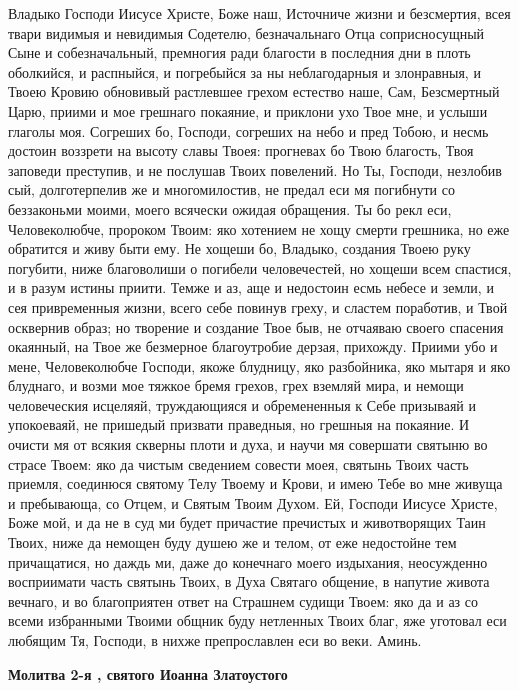 Владыко Господи Иисусе Христе, Боже наш, Источниче жизни и безсмертия, всея твари видимыя и невидимыя Содетелю, безначальнаго Отца соприсносущный Сыне и собезначальный, премногия ради благости в последния дни в плоть оболкийся, и распныйся, и погребыйся за ны неблагодарныя и злонравныя, и Твоею Кровию обновивый растлевшее грехом естество наше, Сам, Безсмертный Царю, приими и мое грешнаго покаяние, и приклони ухо Твое мне, и услыши глаголы моя. Согреших бо, Господи, согреших на небо и пред Тобою, и несмь достоин воззрети на высоту славы Твоея: прогневах бо Твою благость, Твоя заповеди преступив, и не послушав Твоих повелений. Но Ты, Господи, незлобив сый, долготерпелив же и многомилостив, не предал еси мя погибнути со беззаконьми моими, моего всячески ожидая обращения. Ты бо рекл еси, Человеколюбче, пророком Твоим: яко хотением не хощу смерти грешника, но еже обратится и живу быти ему. Не хощеши бо, Владыко, создания Твоею руку погубити, ниже благоволиши о погибели человечестей, но хощеши всем спастися, и в разум истины приити. Темже и аз, аще и недостоин есмь небесе и земли, и сея привременныя жизни, всего себе повинув греху, и сластем поработив, и Твой осквернив образ; но творение и создание Твое быв, не отчаяваю своего спасения окаянный, на Твое же безмерное благоутробие дерзая, прихожду. Приими убо и мене, Человеколюбче Господи, якоже блудницу, яко разбойника, яко мытаря и яко блуднаго, и возми мое тяжкое бремя грехов, грех вземляй мира, и немощи человеческия исцеляяй, труждающияся и обремененныя к Себе призываяй и упокоеваяй, не пришедый призвати праведныя, но грешныя на покаяние. И очисти мя от всякия скверны плоти и духа, и научи мя совершати святыню во страсе Твоем: яко да чистым сведением совести моея, святынь Твоих часть приемля, соединюся святому Телу Твоему и Крови, и имею Тебе во мне живуща и пребывающа, со Отцем, и Святым Твоим Духом. Ей, Господи Иисусе Христе, Боже мой, и да не в суд ми будет причастие пречистых и животворящих Таин Твоих, ниже да немощен буду душею же и телом, от еже недостойне тем причащатися, но даждь ми, даже до конечнаго моего издыхания, неосужденно восприимати часть святынь Твоих, в Духа Святаго общение, в напутие живота вечнаго, и во благоприятен ответ на Страшнем судищи Твоем: яко да и аз со всеми избранными Твоими общник буду нетленных Твоих благ, яже уготовал еси любящим Тя, Господи, в нихже препрославлен еси во веки. Аминь.


\medskip
\bfseries Молитва 2-я , святого Иоанна Златоустого\normalfont{}


